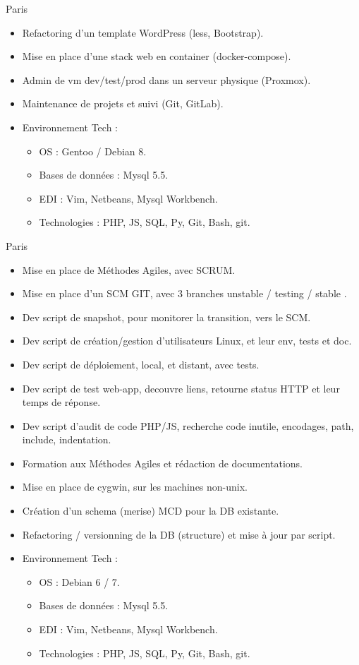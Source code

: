 \documentclass[10pt,a4paper,sans]{moderncv}
\begin{document}
{Paris}{
  \begin{itemize}%
    \item Refactoring d'un template WordPress (less, Bootstrap).
    \item Mise en place d'une stack web en container (docker-compose).
    \item Admin de vm dev/test/prod dans un serveur physique (Proxmox).
    \item Maintenance de projets et suivi (Git, GitLab).
    \item Environnement Tech :
      \begin{itemize}%
        \item OS : Gentoo / Debian 8.
        \item Bases de données : Mysql 5.5.
        \item EDI : Vim, Netbeans, Mysql Workbench.
        \item Technologies : PHP, JS, SQL, Py, Git, Bash, git.
      \end{itemize}
  \end{itemize}}

{Paris}{
  \begin{itemize}%
    \item Mise en place de Méthodes Agiles, avec SCRUM.
    \item Mise en place d'un SCM GIT, avec 3 branches unstable / testing / stable .
    \item Dev script de snapshot, pour monitorer la transition, vers le SCM.
    \item Dev script de création/gestion d'utilisateurs Linux, et leur env, tests et doc.
    \item Dev script de déploiement, local, et distant, avec tests.
    \item Dev script de test web-app, decouvre liens, retourne status HTTP et leur temps de réponse.
    \item Dev script d'audit de code PHP/JS, recherche code inutile, encodages, path, include, indentation.
    \item Formation aux Méthodes Agiles et rédaction de documentations.
    \item Mise en place de cygwin, sur les machines non-unix.
    \item Création d'un schema (merise) MCD pour la DB existante.
    \item Refactoring / versionning de la DB (structure) et mise à jour par script.
    \item Environnement Tech :
      \begin{itemize}%
        \item OS : Debian 6 / 7.
        \item Bases de données : Mysql 5.5.
        \item EDI : Vim, Netbeans, Mysql Workbench.
        \item Technologies : PHP, JS, SQL, Py, Git, Bash, git.
      \end{itemize}
  \end{itemize}}
\end{document}
